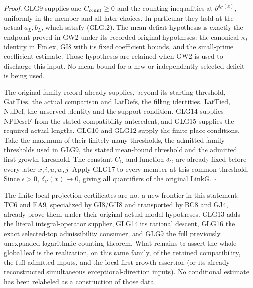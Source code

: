 \emph{Proof.}
GLG9 supplies one \(C_{\rm count}\ge0\) and the counting
inequalities at \(b^{\delta_G(x)}\), uniformly in the
member and all later choices. In particular they hold
at the actual \(a_L,b_L\), which satisfy (GLG.2).
The mean-deficit hypothesis is exactly the endpoint
proved in GW2 under its recorded original hypotheses:
the canonical \(\kappa_I\) identity in \(\mathrm{Fm.ex}\),
GI8 with its fixed coefficient bounds, and the small-prime
coefficient estimate. Those hypotheses are retained
when GW2 is used to discharge this input. No mean bound
for a new or independently selected deficit is being used.

The original family record already supplies, beyond
its starting threshold, \(\mathrm{GatTies}\), the actual
comparison and \(\mathrm{LatDefs}\), the filling identities,
\(\mathrm{LatTied}\), \(\mathrm{NuDef}\), the unserved
identity and the support condition. GLG14 supplies
\(\mathrm{NPDescF}\) from the stated compatibility
antecedent, and GLG15 supplies the required actual lengths.
GLG10 and GLG12 supply the finite-place conditions.
Take the maximum of their finitely many thresholds,
the admitted-family thresholds used in GLG9, the
stated mean-bound threshold and the admitted
first-growth threshold.
The constant \(C_G\) and function \(\delta_G\) are
already fixed before every later \(x,i,u,w,j\).
Apply GLG17 to every member at this common threshold.
Since \(\epsilon>0\), \(\delta_G(x)\to0\), giving
all quantifiers of the original \(\mathrm{LinkG}\).
\hfill\(\square\)

The finite local projection certificates are not a new
frontier in this statement: TC6 and EA9, specialized by
GI8/GII8 and transported by BC8 and GJ4, already prove them
under their original actual-model hypotheses. GLG13
adds the literal integral-operator supplier, GLG14
its rational descent, GLG16 the exact selected-top
admissibility consumer, and GLG9 the full previously
unexpanded logarithmic counting theorem. What remains
to assert the whole global leaf is the realization,
on this same family, of the retained compatibility,
the full admitted inputs, and the local first-growth
assertion (or its already reconstructed simultaneous
exceptional-direction inputs). No conditional estimate
has been relabeled as a construction of those data.
